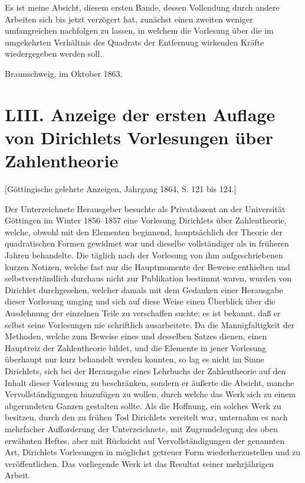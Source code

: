 \documentclass[11pt]{article}
\newcommand{\origpage}[1]{\par\vspace{0.25em}\noindent{\footnotesize\itshape [Gedruckte Seite #1]}\par\vspace{0.25em}}
\begin{document}
\origpage{393}
Es ist meine Absicht, diesem ersten Bande, dessen Vollendung durch andere Arbeiten sich bis jetzt verzögert hat, zunächst einen zweiten weniger umfangreichen nachfolgen zu lassen, in welchem die Vorlesung über die im umgekehrten Verhältnis des Quadrats der Entfernung wirkenden Kräfte wiedergegeben werden soll.

\begin{flushright}Braunschweig, im Oktober 1863.\end{flushright}

\origpage{394}
\section*{LIII. Anzeige der ersten Auflage von Dirichlets Vorlesungen über Zahlentheorie}
\begin{center}\small [Göttingische gelehrte Anzeigen, Jahrgang 1864, S. 121 bis 124.]\end{center}

Der Unterzeichnete Herausgeber besuchte als Privatdozent an der Universität Göttingen im Winter 1856--1857 eine Vorlesung Dirichlets über Zahlentheorie, welche, obwohl mit den Elementen beginnend, hauptsächlich der Theorie der quadratischen Formen gewidmet war und dieselbe vollständiger als in früheren Jahren behandelte. Die täglich nach der Vorlesung von ihm aufgeschriebenen kurzen Notizen, welche fast nur die Hauptmomente der Beweise enthielten und selbstverständlich durchaus nicht zur Publikation bestimmt waren, wurden von Dirichlet durchgesehen, welcher damals mit dem Gedanken einer Herausgabe dieser Vorlesung umging und sich auf diese Weise einen Überblick über die Ausdehnung der einzelnen Teile zu verschaffen suchte; es ist bekannt, daß er selbst seine Vorlesungen nie schriftlich ausarbeitete. Da die Mannigfaltigkeit der Methoden, welche zum Beweise eines und desselben Satzes dienen, einen Hauptreiz der Zahlentheorie bildet, und die Elemente in jener Vorlesung überhaupt nur kurz behandelt werden konnten, so lag es nicht im Sinne Dirichlets, sich bei der Herausgabe eines Lehrbuchs der Zahlentheorie auf den Inhalt dieser Vorlesung zu beschränken, sondern er äußerte die Absicht, manche Vervollständigungen hinzufügen zu wollen, durch welche das Werk sich zu einem abgerundeten Ganzen gestalten sollte. Als die Hoffnung, ein solches Werk zu besitzen, durch den zu frühen Tod Dirichlets vereitelt war, unternahm es nach mehrfacher Aufforderung der Unterzeichnete, mit Zugrundelegung des oben erwähnten Heftes, aber mit Rücksicht auf Vervollständigungen der genannten Art, Dirichlets Vorlesungen in möglichst getreuer Form wiederherzustellen und zu veröffentlichen. Das vorliegende Werk ist das Resultat seiner mehrjährigen Arbeit.
\end{document}
